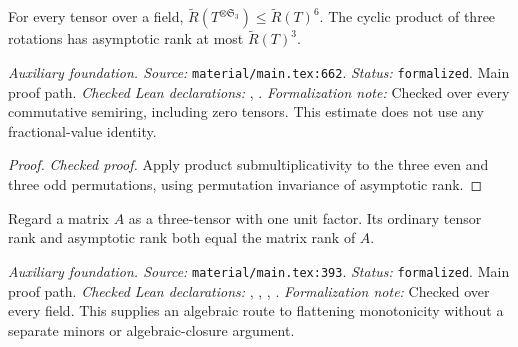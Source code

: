 \renewcommand{\thetheorem}{A49}
\begin{lemma}
\label{aux:symmetrization-rank-bound}
\leanok
For every tensor over a field, $\widetilde R(T^{\otimes\mathfrak S_3})\le\widetilde R(T)^6$. The cyclic product of three rotations has asymptotic rank at most $\widetilde R(T)^3$.
\end{lemma}

\noindent\textit{Auxiliary foundation. Source:} \texttt{material/main.tex:662}.
\textit{Status:} \texttt{formalized}. Main proof path.
\textit{Checked Lean declarations:} , .
\textit{Formalization note:} Checked over every commutative semiring, including zero tensors. This estimate does not use any fractional-value identity.

\begin{proof}
\leanok
{}
\textit{Checked proof.} Apply product submultiplicativity to the three even and three odd permutations, using permutation invariance of asymptotic rank.
\end{proof}

\renewcommand{\thetheorem}{A50}
\begin{lemma}
\label{aux:matrix-tensor-rank}
\leanok
Regard a matrix $A$ as a three-tensor with one unit factor. Its ordinary tensor rank and asymptotic rank both equal the matrix rank of $A$.
\end{lemma}

\noindent\textit{Auxiliary foundation. Source:} \texttt{material/main.tex:393}.
\textit{Status:} \texttt{formalized}. Main proof path.
\textit{Checked Lean declarations:} , , , .
\textit{Formalization note:} Checked over every field. This supplies an algebraic route to flattening monotonicity without a separate minors or algebraic-closure argument.

